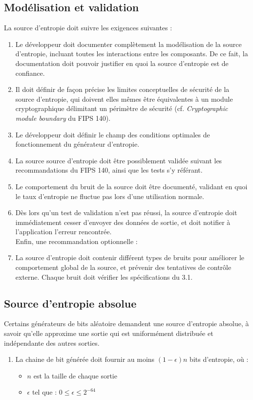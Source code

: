 \subsection{Modélisation et validation}
La source d'entropie doit suivre les exigences suivantes :
\begin{enumerate}
\item Le développeur doit documenter complètement la modélisation de la source d'entropie, incluant toutes les interactions entre les composants. De ce fait, la documentation doit pouvoir justifier en quoi la source d'entropie est de confiance. 
\item Il doit définir de façon précise les limites conceptuelles de sécurité de la source d'entropie, qui doivent elles mêmes être équivalentes à un module cryptographique délimitant un périmètre de sécurité (cf. \textit{Cryptographic module boundary} du FIPS 140).
\item Le développeur doit définir le champ des conditions optimales de fonctionnement du générateur d'entropie.
\item La source source d'entropie doit être possiblement validée suivant les recommandations du FIPS 140, ainsi que les tests s'y référant.
\item Le comportement du bruit de la source doit être documenté, validant en quoi le taux d'entropie ne fluctue pas lors d'une utilisation normale.
\item Dès lors qu'un test de validation n'est pas réussi, la source d'entropie doit immédiatement cesser d'envoyer des données de sortie, et doit notifier à l'application l'erreur rencontrée.\\

Enfin, une recommandation optionnelle : 
\item La source d'entropie doit contenir différent types de bruits pour améliorer le comportement global de la source, et prévenir des tentatives de contrôle externe. Chaque bruit doit vérifier les spécifications du 3.1. 
\end{enumerate}

\subsection{Source d'entropie absolue}
Certains générateurs de bits aléatoire demandent une source d'entropie absolue, à savoir qu'elle approxime une sortie qui est uniformément distribuée et indépendante des autres sorties. 
\begin{enumerate}
\item La chaine de bit générée doit fournir au moins $(1-\epsilon)n$ bits d'entropie, où : 
	\begin{itemize}
	\item $n$ est la taille de chaque sortie
	\item $\epsilon$ tel que : $0\leqslant \epsilon \leqslant 2^{-64}$
	\end{itemize}
\end{enumerate}

